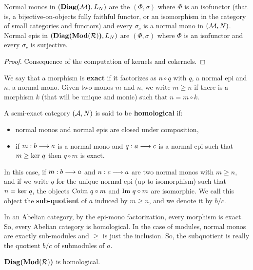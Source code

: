 	\begin{prop} Normal monos in $(\textbf{Diag(}\mathcal{M}\textbf{)},L_N)$ are the $(\Phi,\sigma)$ where $\Phi$ is an isofunctor (that is, a bijective-on-objects fully faithful functor, or an isomorphism in the category of small categories and functors) and every $\sigma_c$ is a normal mono in $(\mathcal{M},N)$. Normal epis in $(\textbf{Diag(}\textbf{Mod}(\mathcal{R})\textbf{)},L_N)$ are $(\Phi,\sigma)$ where $\Phi$ is an isofunctor and every $\sigma_c$ is surjective. \end{prop}
	
	\begin{proof}
	Consequence of the computation of kernels and cokernels.
	\end{proof}
	
	\begin{defi}
We say that a morphism is \textbf{exact} if it factorizes as $n\circ q$ with $q$, a normal epi and $n$, a normal mono. Given two monos $m$ and $n$, we write $m \geq n$ if there is a morphism $k$ (that will be unique and monic) such that $n = m\circ k$.

A semi-exact category $({\mathcal{A}}, N)$ is said to be \textbf{homological} if:
\begin{itemize}
	\item normal monos and normal epis are closed under composition,
	\item if $m : b \longrightarrow a$ is a normal mono and $q : a \longrightarrow c$ is a normal epi such that $m \geq \text{ker }q$ then $q \circ m$ is exact. 
	\end{itemize}
In this case, if $m : b \longrightarrow a$ and $n : c \longrightarrow a$ are two normal monos with $m \geq n$, and if we write $q$ for the unique normal epi (up to isomorphism) such that $n = \text{ker }q$, the objects $\text{Coim }q\circ m$ and $\text{Im }q\circ m$ are isomorphic. We call this object the \textbf{sub-quotient} of $a$ induced by $m\geq n$, and we denote it by $b/c$.
\end{defi}

In an Abelian category, by the epi-mono factorization, every morphism is exact. So, every Abelian category is homological. In the case of modules, normal monos are exactly sub-modules and $\geq$ is just the inclusion. So, the subquotient is really the quotient $b/c$ of submodules of $a$.

\begin{prop} $\textbf{Diag(}\textbf{Mod}(\mathcal{R})\textbf{)}$ is homological.\end{prop}

